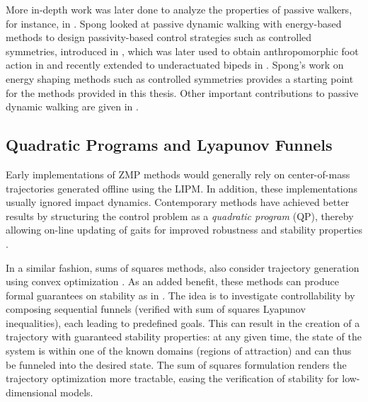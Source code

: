 More in-depth work was later done to analyze the properties of passive walkers,
for instance, in \cite{Espiau1994, Garcia1998, Borzova2004}.
%
Spong \cite{Spong1999} looked at passive dynamic walking with energy-based
methods to design passivity-based control strategies such as controlled
symmetries, introduced in \cite{Spong2005}, which was later used to obtain
anthropomorphic foot action in \cite{Sinnet2009, Sinnet2009a} and recently
extended to underactuated bipeds in \cite{Hu2011}.
%
Spong's work on energy shaping methods such as controlled symmetries provides a
starting point for the methods provided in this thesis.
Other important contributions to passive dynamic walking are given in
\cite{Anderson2005, Kuo1999, Kuo2002, Wisse2007}.


\subsection{Quadratic Programs and Lyapunov Funnels}

Early implementations of ZMP methods would generally rely on center-of-mass
trajectories generated offline using the LIPM.
%
In addition, these implementations usually ignored impact dynamics.
%
Contemporary methods have achieved better results by structuring the control
problem as a {\em quadratic program} (QP), thereby allowing on-line updating of
gaits for improved robustness and stability properties \cite{Kudoh2002,
  Stephens2010, Herdt2010}.
%

In a similar fashion, sums of squares methods, also consider trajectory
generation using convex optimization \cite{Tedrake2010}.
%
As an added benefit, these methods can produce formal guarantees on stability as
in \cite{Majumdar2013}.
%
The idea is to investigate controllability by composing sequential funnels
(verified with sum of squares Lyapunov inequalities), each leading to predefined
goals.
%
This can result in the creation of a trajectory with guaranteed stability
properties:
%
at any given time, the state of the system is within one of the known domains
(regions of attraction) and can thus be funneled into the desired state.
%
The sum of squares formulation renders the trajectory optimization more
tractable, easing the verification of stability for low-dimensional models.
